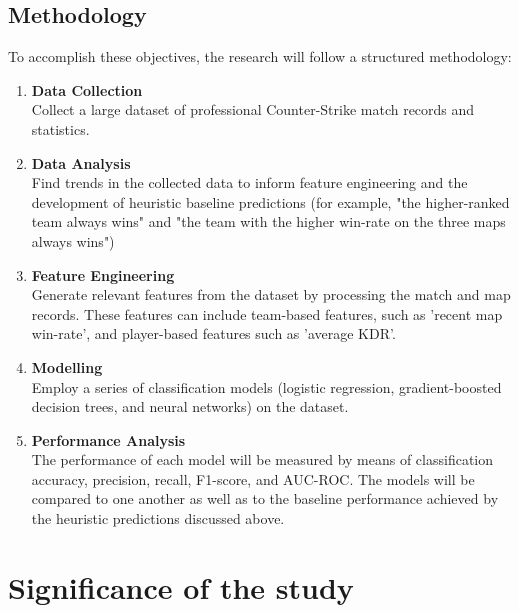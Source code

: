 \subsection{Methodology}

To accomplish these objectives, the research will follow a structured methodology:

\begin{enumerate}
	\item \textbf{Data Collection}\\
	Collect a large dataset of professional Counter-Strike match records and statistics.
	\item \textbf{Data Analysis}\\
	Find trends in the collected data to inform feature engineering and the development of heuristic baseline predictions (for example, "the higher-ranked team always wins" and "the team with the higher win-rate on the three maps always wins")
	\item \textbf{Feature Engineering}\\
	Generate relevant features from the dataset by processing the match and map records. These features can include team-based features, such as 'recent map win-rate', and player-based features such as 'average KDR'.
	\item \textbf{Modelling}\\
	Employ a series of classification models (logistic regression, gradient-boosted decision trees, and neural networks) on the dataset.
	\item \textbf{Performance Analysis}\\
	The performance of each model will be measured by means of classification accuracy, precision, recall, F1-score, and AUC-ROC. The models will be compared to one another as well as to the baseline performance achieved by the heuristic predictions discussed above. 
\end{enumerate}


\section{Significance of the study}

